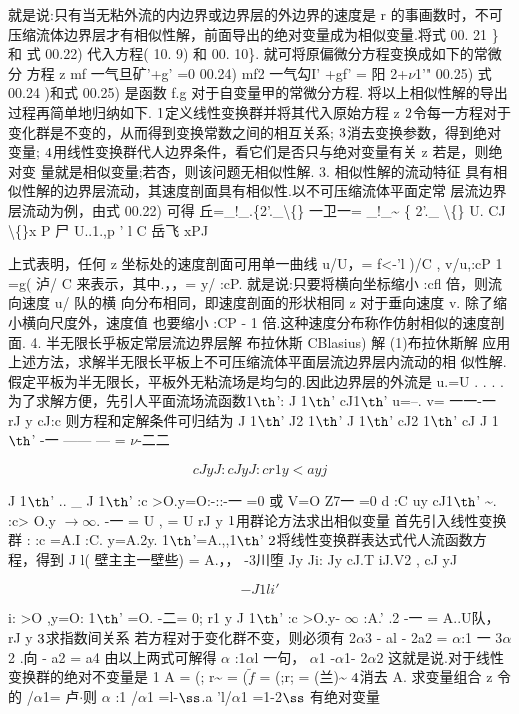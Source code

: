 就是说:只有当无粘外流的内边界或边界层的外边界的速度是 r 的事画数时，不可 压缩流体边界层才有相似性解，前面导出的绝对变量成为相似变量.将式 00. 21 \}和 式 00.22) 代入方程( 10. 9) 和 00. 10\}. 就可将原偏微分方程变换成如下的常微分 方程 z mf 一气旦矿'+g' =0 00.24) mf2 一气勾I' +gf' = 阳 2+$\nu$1'" 00.25) 式 00.24 )和式 00.25) 是函数 f.g 对于自变量甲的常微分方程. 将以上相似性解的导出过程再简单地归纳如下. ${\rm 1}$定义线性变换群并将其代入原始方程 z ${\rm 2}$令每一方程对于变化群是不变的，从而得到变换常数之间的相互关系; ${\rm 3}$消去变换参数，得到绝对变量; ${\rm 4}$用线性变换群代人边界条件，看它们是否只与绝对变量有关 z 若是，则绝对变 量就是相似变量;若杏，则该问题无相似性解. 3. 相似性解的流动特征 具有相似性解的边界层流动，其速度剖面具有相似性.以不可压缩流体平面定常 层流边界层流动为例，由式 00.22) 可得 丘=\_!\_.\{2'.\_\textbackslash\{\} 一卫一= \_!\_\textasciitilde{} \{ 2'.\_ \textbackslash\{\} U. CJ \textbackslash\{\}x P 尸 U..1.,p ' l C 岳飞 xPJ

上式表明，任何 z 坐标处的速度剖面可用单一曲线 u/U，= f<-'l )/C , v/u,:cP 1 =g( 泸/ C 来表示，其中.，，= y/ :cP. 就是说:只要将横向坐标缩小 :cfl 倍，则流向速度 u/ 队的横 向分布相同，即速度剖面的形状相同 z 对于垂向速度 v. 除了缩小横向尺度外，速度值 也要缩小 :CP - 1 倍.这种速度分布称作仿射相似的速度剖面. 4. 半无限长乎板定常层流边界层解 布拉休斯 CBlasius) 解 (1)布拉休斯解 应用上述方法，求解半无限长平板上不可压缩流体平面层流边界层内流动的相 似性解.假定平板为半无限长，平板外无粘流场是均匀的.因此边界层的外流是 u.=U . . . . 为了求解方便，先引人平面流场流函数1${\rm þ}$': J 1${\rm þ}$' cJ1${\rm þ}$' u=--. v= 一一-一 rJ y cJ:c 则方程和定解条件可归结为 J 1${\rm þ}$' J2 1${\rm þ}$' J 1${\rm þ}$' cJ2 1${\rm þ}$' cJ J 1${\rm þ}$' -一 ------ --- = $\nu$-二二

\[cJ y J:cJy J:c r1 y< a yj\]

J 1${\rm þ}$' .. \_ J 1${\rm þ}$' :c >O.y=O:-::-一 =0 或 V=O Z7一 =0 d :C uy cJ1${\rm þ}$' \textasciitilde{}. :c> O.y $\rightarrow$$\infty$. -一 = U , = U rJ y ${\rm 1}$用群论方法求出相似变量 首先引入线性变换群 : :c =A.I :C. y=A.2y. 1${\rm þ}$'=A.,,1${\rm þ}$' ${\rm 2}$将线性变换群表达式代人流函数方程，得到 J l( 壁主主一壁些) = A.，， -3川堕 Jy Ji: Jy cJ.T iJ.V2 , cJ yJ

\[- J 1li'\]

i: >O ,y=O: 1${\rm þ}$' =O. -二= 0; r1 y J 1${\rm þ}$' :c >O.y- $\infty$ :A.' .2 -一 = A..U队， rJ y ${\rm 3}$求指数间关系 若方程对于变化群不变，则必须有 2$\alpha$3 - al - 2a2 = $\alpha$:1 一 3$\alpha$2 .向 - a2 = a4 由以上两式可解得 $\alpha$ :1$\alpha$l 一句， $\alpha$1 -$\alpha$1- 2$\alpha$2 这就是说.对于线性变换群的绝对不变量是 1 A = (; r\textasciitilde{} = ($\tilde{f}$ = (;r; = (兰)\textasciitilde{} ${\rm 4}$消去 A. 求变量组合 z 令的 /$\alpha$1= 卢$\cdot $则 $\alpha$ :1 /$\alpha$1 =l-${\rm ß}$.a 'l/$\alpha$1 =1-2${\rm ß}$ 有绝对变量

